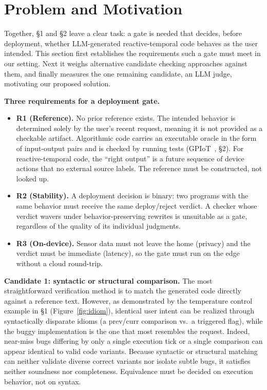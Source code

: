 \documentclass[sigconf,nonacm,anonymous,review]{acmart}
\begin{document}
\section{Problem and Motivation}

Together, \S1 and \S2 leave a clear task: a gate is needed that decides, before deployment, whether LLM-generated reactive-temporal code behaves as the user intended. This section first establishes the requirements such a gate must meet in our setting. Next it weighs alternative candidate checking approaches against them, and finally measures the one remaining candidate, an LLM judge, motivating our proposed solution.

\textbf{Three requirements for a deployment gate.}
\begin{itemize}
\item \textbf{R1 (Reference).} No prior reference exists. The intended behavior is determined solely by the user’s recent request, meaning it is not provided as a checkable artifact.
Algorithmic code carries an executable oracle in the form of input-output pairs and is checked by running tests (GPIoT~\cite{gpiot}, \S2). For reactive-temporal code, the ``right output'' is a future sequence of device actions that no external source labels. The reference must be constructed, not looked up.
\item \textbf{R2 (Stability).} A deployment decision is binary: two programs with the same behavior must receive the same deploy/reject verdict. A checker whose verdict wavers under behavior-preserving rewrites is unsuitable as a gate, regardless of the quality of its individual judgments.
\item \textbf{R3 (On-device).} Sensor data must not leave the home (privacy) and the verdict must be immediate (latency), so the gate must run on the edge without a cloud round-trip.
\end{itemize}

\textbf{Candidate 1: syntactic or structural comparison.} The most straightforward verification method is to match the generated code directly against a reference text. However, as demonstrated by the temperature control example in \S1 (Figure~\ref{fig:idiom}), identical user intent can be realized through syntactically disparate idioms (a prev/curr comparison vs.\ a triggered flag), while the buggy implementation is the one that most resembles the request. Indeed, near-miss bugs differing by only a single execution tick or a single comparison can appear identical to valid code variants. Because syntactic or structural matching can neither validate diverse correct variants nor isolate subtle bugs, it satisfies neither soundness nor completeness.
Equivalence must be decided on execution behavior, not on syntax.
\end{document}

